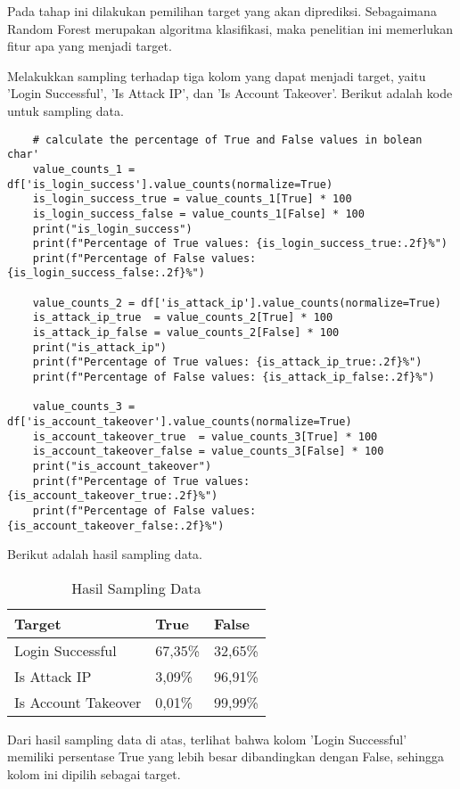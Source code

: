 Pada tahap ini dilakukan pemilihan target yang akan diprediksi. Sebagaimana Random Forest merupakan algoritma klasifikasi, maka penelitian ini memerlukan fitur apa yang menjadi target.

Melakukkan sampling terhadap tiga kolom yang dapat menjadi target, yaitu 'Login Successful', 'Is Attack IP', dan 'Is Account Takeover'. Berikut adalah kode untuk sampling data.

\begin{lstlisting}
    # calculate the percentage of True and False values in bolean char'
    value_counts_1 = df['is_login_success'].value_counts(normalize=True)
    is_login_success_true = value_counts_1[True] * 100
    is_login_success_false = value_counts_1[False] * 100
    print("is_login_success")
    print(f"Percentage of True values: {is_login_success_true:.2f}%")
    print(f"Percentage of False values: {is_login_success_false:.2f}%")

    value_counts_2 = df['is_attack_ip'].value_counts(normalize=True)
    is_attack_ip_true  = value_counts_2[True] * 100
    is_attack_ip_false = value_counts_2[False] * 100
    print("is_attack_ip")
    print(f"Percentage of True values: {is_attack_ip_true:.2f}%")
    print(f"Percentage of False values: {is_attack_ip_false:.2f}%")

    value_counts_3 = df['is_account_takeover'].value_counts(normalize=True)
    is_account_takeover_true  = value_counts_3[True] * 100
    is_account_takeover_false = value_counts_3[False] * 100
    print("is_account_takeover")
    print(f"Percentage of True values: {is_account_takeover_true:.2f}%")
    print(f"Percentage of False values: {is_account_takeover_false:.2f}%")
\end{lstlisting}

    Berikut adalah hasil sampling data.

    \begin{table}[H]
        \caption{Hasil Sampling Data}
        \centering
        \begin{tabular}{|l|l|l|}
        \hline
        \textbf{Target} & \textbf{True} & \textbf{False} \\ \hline
        Login Successful & 67,35\% & 32,65\% \\ \hline
        Is Attack IP & 3,09\% & 96,91\% \\ \hline
        Is Account Takeover & 0,01\% & 99,99\% \\ \hline
        \end{tabular}
        \label{tab:sampling_data}
        \end{table}

        Dari hasil sampling data di atas, terlihat bahwa kolom 'Login Successful' memiliki persentase True yang lebih besar dibandingkan dengan False, sehingga kolom ini dipilih sebagai target.
